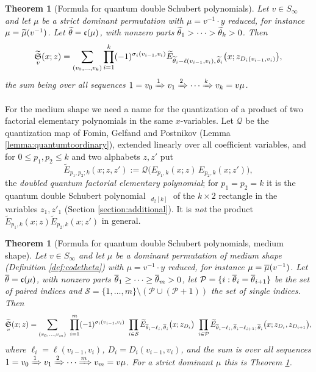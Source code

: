 \documentclass{amsart}
\newtheorem{theorem}[lemma]{Theorem}
\theoremstyle{definition}
\theoremstyle{remark}
\numberwithin{equation}{section}
\DeclareMathOperator{\qsch}{\widetilde{\mathfrak{S}}}
\newcommand{\code}{\mathfrak{c}}
\newcommand{\qelem}{\widetilde{E}}
\begin{document}
\begin{theorem}[Formula for quantum double Schubert polynomials] \label{theorem:quandouble}
Let $v\in S_\infty$ and let $\mu$ be a strict dominant permutation with $\mu=v^{-1}\cdot y$ reduced, for instance $\mu=\widetilde{\mu}(v^{-1})$. Let $\thop=\code(\mu)$, with nonzero parts $\widetilde{\theta}_1>\cdots>\widetilde{\theta}_k>0$. Then
$$\qsch_v(x;z)=\sum_{(v_0,\ldots,v_k)}\prod_{i=1}^k (-1)^{\sigma_i(v_{i-1},v_i)}\qelem_{\thop_i-\ell(v_{i-1},v_i),\,\thop_i}\big(x;z_{D_i(v_{i-1},v_i)}\big),$$
the sum being over all sequences $1=v_0\xRightarrow{1}v_1\xRightarrow{2}\cdots\xRightarrow{k}v_k=v\mu$.
\end{theorem}

For the medium shape we need a name for the quantization of a product of two factorial elementary polynomials in the same $x$-variables. Let $\mathcal Q$ be the quantization map of Fomin, Gelfand and Postnikov (Lemma \ref{lemma:quantumtoordinary}), extended linearly over all coefficient variables, and for $0\leq p_1,p_2\leq k$ and two alphabets $z,z'$ put
\begin{equation}\label{eq:qelemdouble}
\qelem_{p_1,p_2;k}(x;z,z'):=\mathcal Q\big(E_{p_1,k}(x;z)\,E_{p_2,k}(x;z')\big),
\end{equation}
the \emph{doubled quantum factorial elementary polynomial}; for $p_1=p_2=k$ it is the quantum double Schubert polynomial $\qsch_{d_2[k]}$ of the $k\times2$ rectangle in the variables $z_1,z'_1$ (Section \ref{section:additional}). It is \emph{not} the product $\qelem_{p_1,k}(x;z)\qelem_{p_2,k}(x;z')$ in general.

\begin{theorem}[Formula for quantum double Schubert polynomials, medium shape] \label{theorem:quandoublemed}
Let $v\in S_\infty$ and let $\mu$ be a dominant permutation of medium shape (Definition \ref{def:codetheta}) with $\mu=v^{-1}\cdot y$ reduced, for instance $\mu=\overline{\mu}(v^{-1})$. Let $\medtheta=\code(\mu)$, with nonzero parts $\overline{\theta}_1\geq\cdots\geq\overline{\theta}_m>0$, let $\mathcal P=\{i:\overline{\theta}_i=\overline{\theta}_{i+1}\}$ be the set of \emph{paired} indices and $\mathcal S=\{1,\ldots,m\}\setminus(\mathcal P\cup(\mathcal P+1))$ the set of \emph{single} indices. Then
$$\qsch_v(x;z)=\sum_{(v_0,\ldots,v_m)}\ \prod_{i=1}^m(-1)^{\sigma_i(v_{i-1},v_i)}\ \prod_{i\in\mathcal S}\qelem_{\medtheta_i-\ell_i,\,\medtheta_i}\big(x;z_{D_i}\big)\ \prod_{i\in\mathcal P}\qelem_{\medtheta_i-\ell_i,\,\medtheta_i-\ell_{i+1};\,\medtheta_i}\big(x;z_{D_i},z_{D_{i+1}}\big),$$
where $\ell_i=\ell(v_{i-1},v_i)$, $D_i=D_i(v_{i-1},v_i)$, and the sum is over all sequences $1=v_0\xRightarrow{1}v_1\xRightarrow{2}\cdots\xRightarrow{m}v_m=v\mu$. For a strict dominant $\mu$ this is Theorem \ref{theorem:quandouble}.
\end{theorem}
\end{document}

